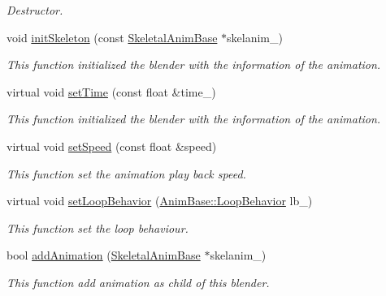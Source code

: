 \begin{DoxyCompactItemize}
\begin{DoxyCompactList}\small\item\em Destructor. \end{DoxyCompactList}\item 
void \hyperlink{class_i_dream_sky_1_1_skeletal_anim_blender_a3d2e38f445866341384f1b97368152dc}{init\+Skeleton} (const \hyperlink{class_i_dream_sky_1_1_skeletal_anim_base}{Skeletal\+Anim\+Base} $\ast$skelanim\+\_\+)
\begin{DoxyCompactList}\small\item\em This function initialized the blender with the information of the animation. \end{DoxyCompactList}\item 
virtual void \hyperlink{class_i_dream_sky_1_1_skeletal_anim_blender_ab80c1e90799256b2bef9da9610e79b04}{set\+Time} (const float \&time\+\_\+)
\begin{DoxyCompactList}\small\item\em This function initialized the blender with the information of the animation. \end{DoxyCompactList}\item 
virtual void \hyperlink{class_i_dream_sky_1_1_skeletal_anim_blender_afaf5a75b6f24eb070c692075207564d4}{set\+Speed} (const float \&speed)
\begin{DoxyCompactList}\small\item\em This function set the animation play back speed. \end{DoxyCompactList}\item 
virtual void \hyperlink{class_i_dream_sky_1_1_skeletal_anim_blender_a8535d7b72b50b66dbdf9178adb6d84bc}{set\+Loop\+Behavior} (\hyperlink{class_i_dream_sky_1_1_anim_base_aac1c8b7253df068cf02101dcd4f586e2}{Anim\+Base\+::\+Loop\+Behavior} lb\+\_\+)
\begin{DoxyCompactList}\small\item\em This function set the loop behaviour. \end{DoxyCompactList}\item 
bool \hyperlink{class_i_dream_sky_1_1_skeletal_anim_blender_ab63b9cb4b608b6fdb46b288aea6b8d3a}{add\+Animation} (\hyperlink{class_i_dream_sky_1_1_skeletal_anim_base}{Skeletal\+Anim\+Base} $\ast$skelanim\+\_\+)
\begin{DoxyCompactList}\small\item\em This function add animation as child of this blender. \end{DoxyCompactList}\item 

\end{DoxyCompactItemize}
